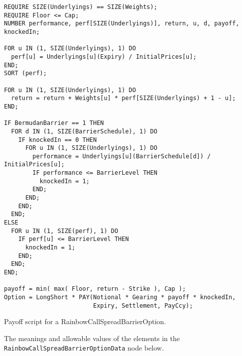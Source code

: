 \begin{listing}[hbt]
\begin{verbatim}
REQUIRE SIZE(Underlyings) == SIZE(Weights);
REQUIRE Floor <= Cap;
NUMBER performance, perf[SIZE(Underlyings)], return, u, d, payoff, knockedIn;

FOR u IN (1, SIZE(Underlyings), 1) DO
  perf[u] = Underlyings[u](Expiry) / InitialPrices[u];
END;
SORT (perf);

FOR u IN (1, SIZE(Underlyings), 1) DO
  return = return + Weights[u] * perf[SIZE(Underlyings) + 1 - u];
END;

IF BermudanBarrier == 1 THEN
  FOR d IN (1, SIZE(BarrierSchedule), 1) DO
    IF knockedIn == 0 THEN
      FOR u IN (1, SIZE(Underlyings), 1) DO
        performance = Underlyings[u](BarrierSchedule[d]) / InitialPrices[u];
        IF performance <= BarrierLevel THEN
          knockedIn = 1;
        END;
      END;
    END;
  END;
ELSE
  FOR u IN (1, SIZE(perf), 1) DO
    IF perf[u] <= BarrierLevel THEN
      knockedIn = 1;
    END;
  END;
END;

payoff = min( max( Floor, return - Strike ), Cap );
Option = LongShort * PAY(Notional * Gearing * payoff * knockedIn,
                         Expiry, Settlement, PayCcy);
\end{verbatim}
\caption{Payoff script for a RainbowCallSpreadBarrierOption.}
\label{lst:rainbow_call_spread_barrier_option}
\end{listing}

The meanings and allowable values of the elements in the \lstinline!RainbowCallSpreadBarrierOptionData! node below.

